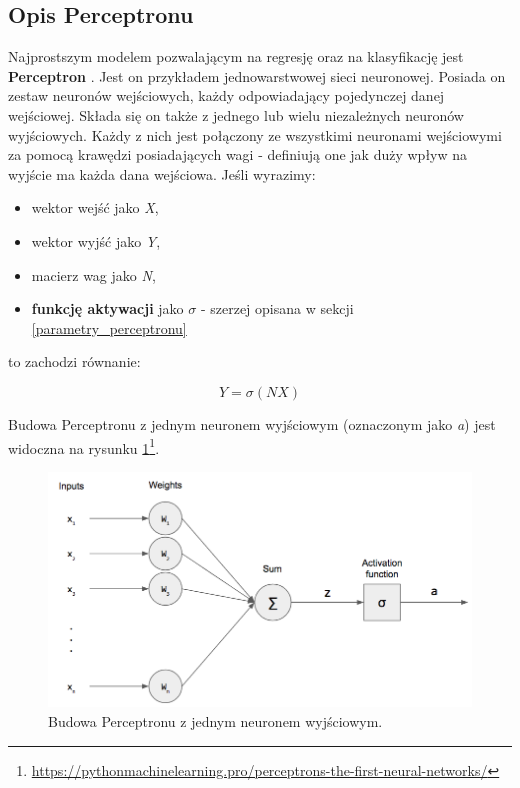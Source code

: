 \documentclass[12pt]{aghdpl}
\newenvironment{tightcenter}{
  \setlength\topsep{0pt}
  \setlength\parskip{0pt}
  \begin{center}
}{
  \end{center}
}
\begin{document}
			\subsection{Opis Perceptronu}
			Najprostszym modelem pozwalającym na regresję oraz na klasyfikację jest \textbf{Perceptron} \cite{perceptron_1}\cite{perceptron_2}. Jest on przykładem jednowarstwowej sieci neuronowej. Posiada on zestaw neuronów wejściowych, każdy odpowiadający pojedynczej danej wejściowej. Składa się on także z jednego lub wielu niezależnych neuronów wyjściowych. Każdy z nich jest połączony ze wszystkimi neuronami wejściowymi za pomocą krawędzi posiadających wagi - definiują one jak duży wpływ na wyjście ma każda dana wejściowa. Jeśli wyrazimy:
			\begin{itemize}
			\item wektor wejść jako \textit{X},
			\item wektor wyjść jako \textit{Y},
			\item macierz wag jako \textit{N},
			\item \textbf{funkcję aktywacji} jako $\sigma$ - szerzej opisana w sekcji \ref{parametry_perceptronu}
			\end{itemize}
			to zachodzi równanie:
			
			\begin{equation}
			Y=\sigma(NX)
			\end{equation}
		
			Budowa Perceptronu z jednym neuronem wyjściowym (oznaczonym jako \textit{a}) jest widoczna na rysunku \ref{fig: budowa_perceptronu}\footnote{\url{https://pythonmachinelearning.pro/perceptrons-the-first-neural-networks/}}.
	
			\begin{figure}[h]
		 		\begin{tightcenter}
		 			\includegraphics[width = \linewidth]{rysunki/perceptron.png}
				\end{tightcenter}	 			
		 			
	 			\caption{Budowa Perceptronu z jednym neuronem wyjściowym.}
				\label{fig: budowa_perceptronu}
			\end{figure}
\end{document}

